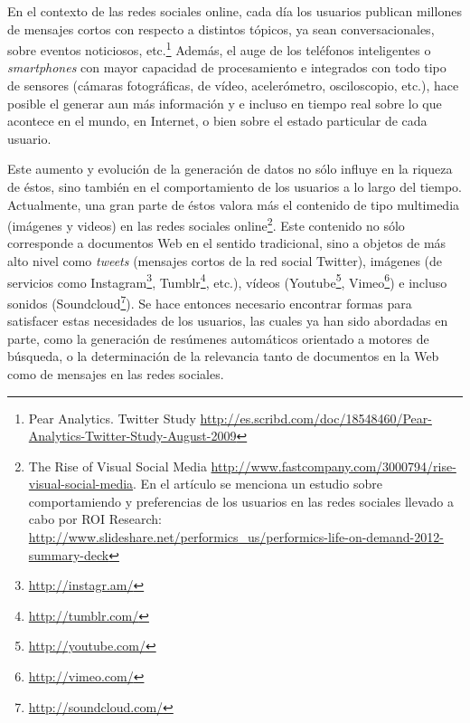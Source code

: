\documentclass[upright, contnum]{umemoria}
\begin{document}
   En el contexto de las redes sociales online, cada día los usuarios
   publican  millones de mensajes cortos con respecto a distintos
   tópicos, ya sean conversacionales, sobre eventos noticiosos, 
   etc.\footnote{Pear Analytics. Twitter Study \href{http://es.scribd.com/doc/18548460/Pear-Analytics-Twitter-Study-August-2009}{http://es.scribd.com/doc/18548460/Pear-Analytics-Twitter-Study-August-2009} }
   Además, el auge de los teléfonos inteligentes o \emph{smartphones} con mayor
   capacidad de procesamiento e integrados con todo tipo de sensores
   (cámaras fotográficas, de vídeo, acelerómetro, osciloscopio, etc.),
   hace posible el generar aun más información y
   e incluso en tiempo real sobre lo que acontece en el mundo, en
   Internet, o bien sobre el estado particular de cada usuario.

   Este aumento y evolución de la generación de datos no sólo influye en la
   riqueza de éstos, sino también en el comportamiento de los usuarios
   a lo largo del tiempo. Actualmente,  una gran parte de éstos valora
   más el contenido de tipo multimedia (imágenes y videos)
   en las redes sociales online\footnote{The Rise of Visual Social Media \href{http://www.fastcompany.com/3000794/rise-visual-social-media}{http://www.fastcompany.com/3000794/rise-visual-social-media}. En el artículo se menciona un estudio sobre comportamiendo y preferencias de los usuarios en las redes sociales llevado a cabo por ROI Research: \href{http://www.slideshare.net/performics_us/performics-life-on-demand-2012-summary-deck}{http://www.slideshare.net/performics\_us/performics-life-on-demand-2012-summary-deck} }. 
   Este contenido no sólo corresponde a documentos Web en el sentido
   tradicional, sino a objetos de más alto nivel como \emph{tweets}
   (mensajes cortos de la red social Twitter), imágenes (de servicios
   como Instagram\footnote{\href{http://instagr.am/}{http://instagr.am/} },
   Tumblr\footnote{\href{http://tumblr.com/}{http://tumblr.com/} }, etc.), vídeos
   (Youtube\footnote{\href{http://youtube.com/}{http://youtube.com/} }, Vimeo\footnote{\href{http://vimeo.com/}{http://vimeo.com/} }) e
   incluso sonidos (Soundcloud\footnote{\href{http://soundcloud.com/}{http://soundcloud.com/} }).
   Se hace entonces necesario encontrar formas para satisfacer estas
   necesidades de los usuarios, las cuales ya han sido
   abordadas en parte, como la generación de
   resúmenes automáticos orientado a motores de búsqueda, o la
   determinación de la relevancia tanto de documentos en la Web como de
   mensajes en las redes sociales.
\end{document}
